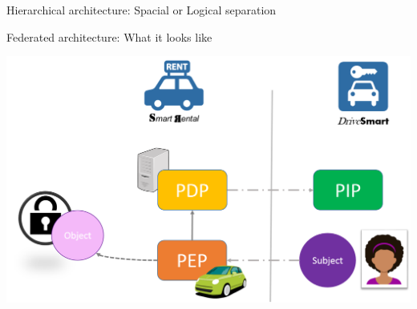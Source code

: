 \begin{frame}{Hierarchical architecture: Spacial or Logical separation}
    \begin{center}
        \end{center}
\end{frame}


\begin{frame}{Federated architecture: What it looks like}
    \begin{center}
        \includegraphics[scale=0.4]{Figures/federated_archi.png}
    \end{center}    
\end{frame}


